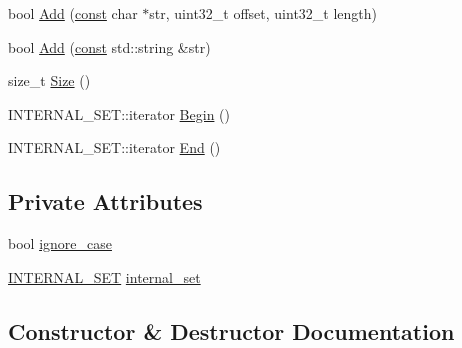 \begin{DoxyCompactItemize}
\item 
bool \mbox{\hyperlink{classlucene_1_1core_1_1analysis_1_1characterutil_1_1CharSet_a1095a6755eea6fdb8bbdcb9a1473016d}{Add}} (\mbox{\hyperlink{ZlibCrc32_8h_a2c212835823e3c54a8ab6d95c652660e}{const}} char $\ast$str, uint32\+\_\+t offset, uint32\+\_\+t length)
\item 
bool \mbox{\hyperlink{classlucene_1_1core_1_1analysis_1_1characterutil_1_1CharSet_a36330b68e40f70ce13cedaaf8c9fdef3}{Add}} (\mbox{\hyperlink{ZlibCrc32_8h_a2c212835823e3c54a8ab6d95c652660e}{const}} std\+::string \&str)
\item 
size\+\_\+t \mbox{\hyperlink{classlucene_1_1core_1_1analysis_1_1characterutil_1_1CharSet_a417143d7ff1ec688ff1cba9cfb65aa8c}{Size}} ()
\item 
I\+N\+T\+E\+R\+N\+A\+L\+\_\+\+S\+E\+T\+::iterator \mbox{\hyperlink{classlucene_1_1core_1_1analysis_1_1characterutil_1_1CharSet_ae20a14777198414d26154c63d2769ad7}{Begin}} ()
\item 
I\+N\+T\+E\+R\+N\+A\+L\+\_\+\+S\+E\+T\+::iterator \mbox{\hyperlink{classlucene_1_1core_1_1analysis_1_1characterutil_1_1CharSet_a644fed6aed2b68682a4d949a2a65d8d7}{End}} ()
\end{DoxyCompactItemize}
\subsection*{Private Attributes}
\begin{DoxyCompactItemize}
\item 
bool \mbox{\hyperlink{classlucene_1_1core_1_1analysis_1_1characterutil_1_1CharSet_a02b6c12938776a5c94003f6ebe784f17}{ignore\+\_\+case}}
\item 
\mbox{\hyperlink{namespacelucene_1_1core_1_1analysis_1_1characterutil_a2b64bd3cca4a8e9112fcbfaebc68aeee}{I\+N\+T\+E\+R\+N\+A\+L\+\_\+\+S\+ET}} \mbox{\hyperlink{classlucene_1_1core_1_1analysis_1_1characterutil_1_1CharSet_a67bb6add3ad46d8eb68c867aadbc2798}{internal\+\_\+set}}
\end{DoxyCompactItemize}


\subsection{Constructor \& Destructor Documentation}
\mbox{\label{classlucene_1_1core_1_1analysis_1_1characterutil_1_1CharSet_a983251c2914f0fbbb46cb6e73864474f}} 
